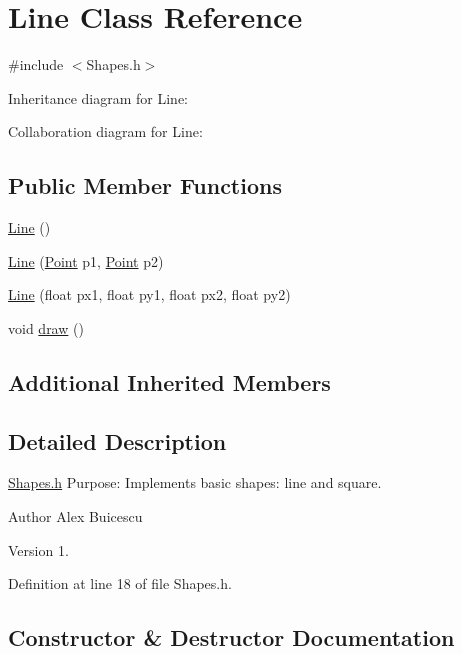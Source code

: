 \hypertarget{class_line}{}\section{Line Class Reference}
\label{class_line}


{\ttfamily \#include $<$Shapes.\+h$>$}



Inheritance diagram for Line\+:


Collaboration diagram for Line\+:
\subsection*{Public Member Functions}
\begin{DoxyCompactItemize}
\item 
\hyperlink{class_line_acc11b8a429d8cdd63ba6803dff5602b3}{Line} ()
\item 
\hyperlink{class_line_afeaa676c7d249d582c5766dc732a78e2}{Line} (\hyperlink{class_point}{Point} p1, \hyperlink{class_point}{Point} p2)
\item 
\hyperlink{class_line_ae9df83cdd720cd7f12d9a0fc2d1d2e65}{Line} (float px1, float py1, float px2, float py2)
\item 
void \hyperlink{class_line_ab6265993bf5acbc28830181c3e712f10}{draw} ()
\end{DoxyCompactItemize}
\subsection*{Additional Inherited Members}


\subsection{Detailed Description}
\hyperlink{_shapes_8h_source}{Shapes.\+h} Purpose\+: Implements basic shapes\+: line and square.

\begin{DoxyAuthor}{Author}
Alex Buicescu 
\end{DoxyAuthor}
\begin{DoxyVersion}{Version}
1. 
\end{DoxyVersion}


Definition at line 18 of file Shapes.\+h.



\subsection{Constructor \& Destructor Documentation}
\hypertarget{class_line_acc11b8a429d8cdd63ba6803dff5602b3}{}
